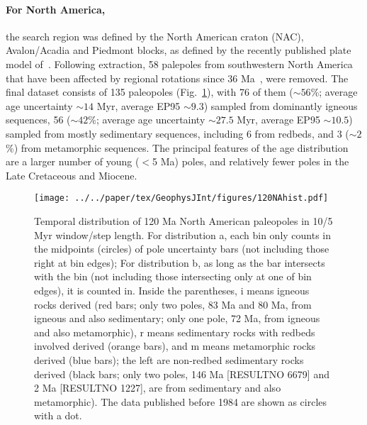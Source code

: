 \paragraph{For North America,}
the search region was defined by the North American craton (NAC), Avalon/Acadia
and Piedmont blocks, as defined by the recently published plate model
of~\citet{Y18}. Following extraction, 58 palepoles from southwestern North
America that have been affected by regional rotations since 36 Ma~\citep{Mc06},
were removed. The final dataset consists of 135 paleopoles
(Fig.~\ref{fig-120NAhist}), with 76 of them (${\sim}56$\%; average age
uncertainty ${\sim}14$ Myr, average EP95 ${\sim}9.3$\degree) sampled from
dominantly igneous sequences, 56 (${\sim}42$\%; average age uncertainty
${\sim}27.5$ Myr, average EP95 ${\sim}10.5$\degree) sampled from mostly
sedimentary sequences, including 6 from redbeds, and 3 (${\sim}2$\%) from
metamorphic sequences. The principal features of the age distribution are a
larger number of young ($<$5 Ma) poles, and relatively fewer poles in the Late
Cretaceous and Miocene.

\begin{figure}
  \centering
  \texttt{[image: ../../paper/tex/GeophysJInt/figures/120NAhist.pdf]}
  \caption[Distribution of 120 Ma North American
    paleopoles]{Temporal distribution of 120 Ma North American
    paleopoles in 10/5 Myr window/step length. For distribution a, each bin only
    counts in the midpoints (circles) of pole uncertainty bars (not including
    those right at bin edges); For distribution b, as long as the bar intersects
    with the bin (not including those intersecting only at one of bin edges), it
    is counted in. Inside the parentheses, i means igneous rocks derived (red
    bars; only two poles, 83 Ma and 80 Ma, from
    igneous and also sedimentary; only one pole, 72 Ma, from
    igneous and also metamorphic), r means sedimentary rocks with redbeds
    involved derived (orange bars), and m means metamorphic rocks derived (blue
    bars); the left are non-redbed sedimentary rocks derived (black bars; only
    two poles, 146 Ma [RESULTNO 6679] and 2 Ma
    [RESULTNO 1227], are from sedimentary and also metamorphic). The data
    published before 1984 are shown as circles with a dot.}\label{fig-120NAhist}
\end{figure}

